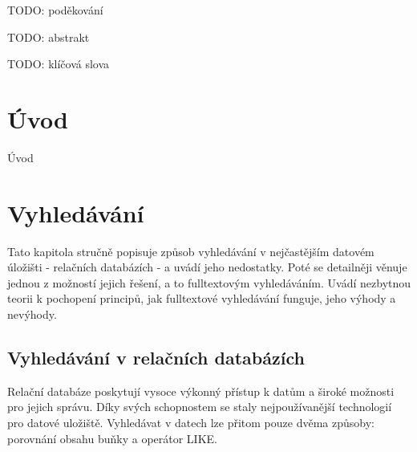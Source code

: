 \documentclass[11pt,draft,oneside]{fithesis2}
\begin{document}
\FrontMatter
\ThesisTitlePage

\begin{ThesisDeclaration}
  \DeclarationText
  \AdvisorName
\end{ThesisDeclaration}

\begin{ThesisThanks}
TODO: poděkování
\end{ThesisThanks}

\begin{ThesisAbstract}
TODO: abstrakt
\end{ThesisAbstract}

\begin{ThesisKeyWords}
TODO: klíčová slova
\end{ThesisKeyWords}

\MainMatter

\tableofcontents


\chapter{Úvod}
Úvod

\chapter{Vyhledávání}
Tato kapitola stručně popisuje způsob vyhledávání v nejčastějším datovém úložišti - relačních databázích - a uvádí jeho nedostatky. Poté se detailněji věnuje jednou z možností jejich řešení, a to fulltextovým vyhledáváním. Uvádí nezbytnou 
teorii k pochopení principů, jak fulltextové vyhledávání funguje, jeho výhody a nevýhody.

\section{Vyhledávání v relačních databázích}
Relační databáze poskytují vysoce výkonný přístup k datům a široké možnosti pro jejich správu. Díky svých schopnostem se staly nejpoužívanější technologií pro datové uložiště. 
Vyhledávat v datech lze přitom pouze dvěma způsoby: porovnání obsahu buňky a operátor LIKE.
\end{document}
